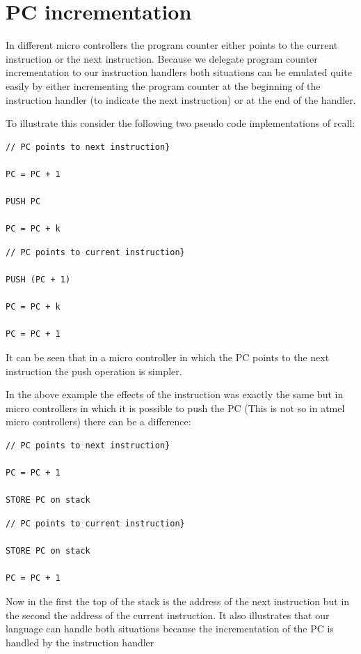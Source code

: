 \documentclass[a4paper]{report}
\begin{document}
\section[PC incrementation]{PC incrementation}
In different micro controllers the program counter either points to the
current instruction or the next instruction. Because we delegate
program counter incrementation to our instruction handlers both
situations can be emulated quite easily by either incrementing the
program counter at the beginning of the instruction handler (to
indicate the next instruction) or at the end of the handler.

To illustrate this consider the following two pseudo code
implementations of rcall:

\begin{verbatim}
// PC points to next instruction}

PC = PC + 1

PUSH PC

PC = PC + k
\end{verbatim}

\begin{verbatim}
// PC points to current instruction}

PUSH (PC + 1)

PC = PC + k

PC = PC + 1
\end{verbatim}

It can be seen that in a micro controller in which the PC points to the
next instruction the push operation is simpler.

In the above example the effects of the instruction was exactly the same
but in micro controllers in which it is possible to push the PC (This
is not so in atmel micro controllers) there can be a difference:

\begin{verbatim}
// PC points to next instruction}

PC = PC + 1

STORE PC on stack
\end{verbatim}

\begin{verbatim}
// PC points to current instruction}

STORE PC on stack

PC = PC + 1
\end{verbatim}

Now in the first the top of the stack is the address of the next
instruction but in the second the address of the current instruction.
It also illustrates that our language can handle both situations
because the incrementation of the PC is handled by the instruction
handler
\end{document}

